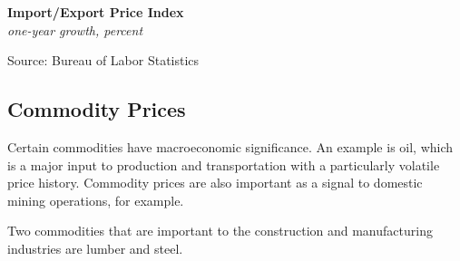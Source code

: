 \documentclass{report}
\makeatletter
\newcommand{\tbllink}[1]{\href{https://raw.githubusercontent.com/bdecon/US-chartbook/master/chartbook/data/#1}{\faTable}}
\newcommand*\short[1]{\expandafter\@gobbletwo\number\numexpr#1\relax}
\newcommand{\dateaxisticks}{
		date coordinates in=x, axis line style={draw=none},
		xmax={2023-02-15},
		max space between ticks=40,	    
		xtick={{1990-01-01}, {1992-01-01}, {1994-01-01}, 
			{1996-01-01}, {1998-01-01}, {2000-01-01}, 
			{2002-01-01}, {2004-01-01}, {2006-01-01},
			{2008-01-01}, {2010-01-01}, {2012-01-01}, {2014-01-01},
		    {2016-01-01}, {2018-01-01}, {2020-01-01}, {2022-01-01}, 
		    {2024-01-01}, {2026-01-01}},
		minor xtick={{1989-01-01}, {1991-01-01}, {1993-01-01},
			{1995-01-01}, {1997-01-01}, {1999-01-01}, 
			{2001-01-01}, {2003-01-01}, {2005-01-01}, {2007-01-01},
		    {2009-01-01}, {2011-01-01}, {2013-01-01}, {2015-01-01},
		    {2017-01-01}, {2019-01-01}, {2021-01-01}, {2023-01-01}, 
		    {2025-01-01}, {2027-01-01}},
		enlarge y limits={0.06}, enlarge x limits={0.01},
		}
\newcommand{\bbar}[2]{extra #1 ticks = {{#2}}, extra #1 tick labels = ,
		extra #1 tick style = {grid=major, grid style={thick, black!25}},}
\newcommand{\stdline}[4]{\addplot[very thick, no markers, color=#1] 
		table [x=#2, y=#3, col sep=comma] {#4};	}
\newcommand{\rbars}{
		\fill[color=black!10] (axis cs:{1990-07-01},\pgfkeysvalueof{/pgfplots/ymin}) rectangle 
			(axis cs:{1991-03-01}, \pgfkeysvalueof{/pgfplots/ymax});
		\fill[color=black!10] (axis cs:{2007-12-01},\pgfkeysvalueof{/pgfplots/ymin}) rectangle 
			(axis cs:{2009-07-01}, \pgfkeysvalueof{/pgfplots/ymax});
		\fill[color=black!10] (axis cs:{2001-03-01},\pgfkeysvalueof{/pgfplots/ymin}) rectangle 
			(axis cs:{2001-11-01}, \pgfkeysvalueof{/pgfplots/ymax});
		\fill[color=black!10] (axis cs:{2020-02-01},\pgfkeysvalueof{/pgfplots/ymin}) rectangle 
			(axis cs:{2020-05-01}, \pgfkeysvalueof{/pgfplots/ymax});}
\makeatother
\begin{document}
{\begin{minipage}{0.76\textwidth}
\normalsize \textbf{Import/Export Price Index}\\
\footnotesize{\textit{one-year growth, percent}}\\
\vspace{2.8cm}

\hspace{4mm} 
\vspace{1mm}

\footnotesize{Source: Bureau of Labor Statistics} \hfill \tbllink{mxpi.csv}
\vspace{2mm}

\hypertarget{prco}{}
\subsection*{Commodity Prices}
\vspace*{-1mm}

\small Certain commodities have macroeconomic significance. An example is oil, which is a major input to production and transportation with a particularly volatile price history. Commodity prices are also important as a signal to domestic mining operations, for example. 

Two commodities that are important to the construction and manufacturing industries are lumber and steel.  
\vspace{2mm}


\end{minipage}}
\end{document}
